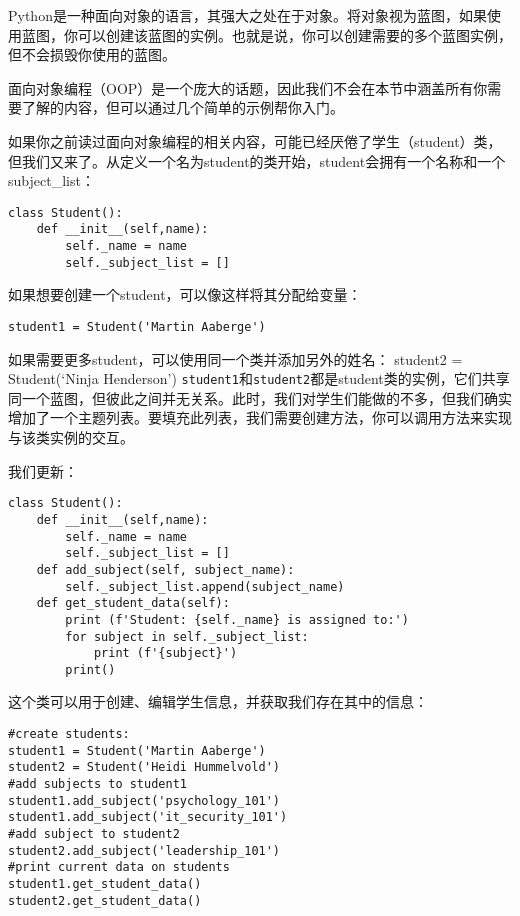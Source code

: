 \documentclass[]{ctexbook}
\begin{document}
Python是一种面向对象的语言，其强大之处在于对象。将对象视为蓝图，如果使用蓝图，你可以创建该蓝图的实例。也就是说，你可以创建需要的多个蓝图实例，但不会损毁你使用的蓝图。

面向对象编程（OOP）是一个庞大的话题，因此我们不会在本节中涵盖所有你需要了解的内容，但可以通过几个简单的示例帮你入门。

如果你之前读过面向对象编程的相关内容，可能已经厌倦了学生（student）类，但我们又来了。从定义一个名为student的类开始，student会拥有一个名称和一个subject\_list：

\begin{verbatim}
class Student():
    def __init__(self,name):
        self._name = name
        self._subject_list = []
\end{verbatim}

如果想要创建一个student，可以像这样将其分配给变量：

\begin{verbatim}
student1 = Student('Martin Aaberge')
\end{verbatim}

如果需要更多student，可以使用同一个类并添加另外的姓名：
student2 = Student(`Ninja Henderson')
\texttt{student1}和\texttt{student2}都是student类的实例，它们共享同一个蓝图，但彼此之间并无关系。此时，我们对学生们能做的不多，但我们确实增加了一个主题列表。要填充此列表，我们需要创建方法，你可以调用方法来实现与该类实例的交互。

我们更新：

\begin{verbatim}
class Student():
    def __init__(self,name):
        self._name = name
        self._subject_list = []
    def add_subject(self, subject_name):
        self._subject_list.append(subject_name)
    def get_student_data(self):
        print (f'Student: {self._name} is assigned to:')
        for subject in self._subject_list:
            print (f'{subject}')
        print()
\end{verbatim}

这个类可以用于创建、编辑学生信息，并获取我们存在其中的信息：

\begin{verbatim}
#create students:
student1 = Student('Martin Aaberge')
student2 = Student('Heidi Hummelvold')
#add subjects to student1
student1.add_subject('psychology_101')
student1.add_subject('it_security_101')
#add subject to student2
student2.add_subject('leadership_101')
#print current data on students
student1.get_student_data()
student2.get_student_data()
\end{verbatim}
\end{document}
